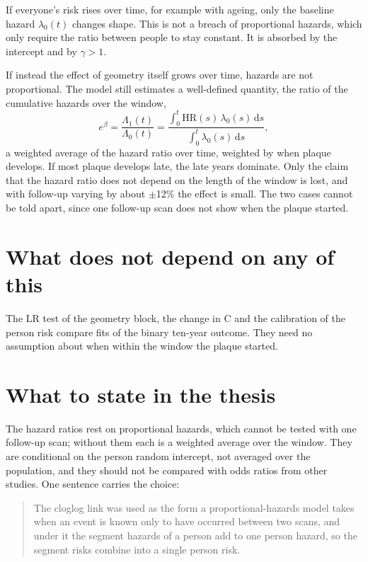 \documentclass[11pt]{article}
\begin{document}
If everyone's risk rises over time, for example with ageing, only the
baseline hazard $\lambda_0(t)$ changes shape. This is not a breach of
proportional hazards, which only require the ratio between people to stay
constant. It is absorbed by the intercept and by $\gamma > 1$.

If instead the effect of geometry itself grows over time, hazards are not
proportional. The model still estimates a well-defined quantity, the ratio of
the cumulative hazards over the window,
\[
  e^{\beta} = \frac{\Lambda_1(t)}{\Lambda_0(t)}
  = \frac{\int_0^t \mathrm{HR}(s)\,\lambda_0(s)\,\mathrm{d}s}
         {\int_0^t \lambda_0(s)\,\mathrm{d}s},
\]
a weighted average of the hazard ratio over time, weighted by when plaque
develops. If most plaque develops late, the late years dominate. Only the
claim that the hazard ratio does not depend on the length of the window is
lost, and with follow-up varying by about $\pm$12\% the effect is small. The
two cases cannot be told apart, since one follow-up scan does not show when
the plaque started.

\section*{What does not depend on any of this}

The LR test of the geometry block, the change in C and the calibration of
the person risk compare fits of the binary ten-year outcome. They need no
assumption about when within the window the plaque started.

\section*{What to state in the thesis}

The hazard ratios rest on proportional hazards, which cannot be tested with
one follow-up scan; without them each is a weighted average over the window.
They are conditional on the person random intercept, not averaged over the
population, and they should not be compared with odds ratios from other
studies. One sentence carries the choice:

\begin{quote}
The cloglog link was used as the form a proportional-hazards model takes when
an event is known only to have occurred between two scans, and under it the
segment hazards of a person add to one person hazard, so the segment risks
combine into a single person risk.
\end{quote}
\end{document}
